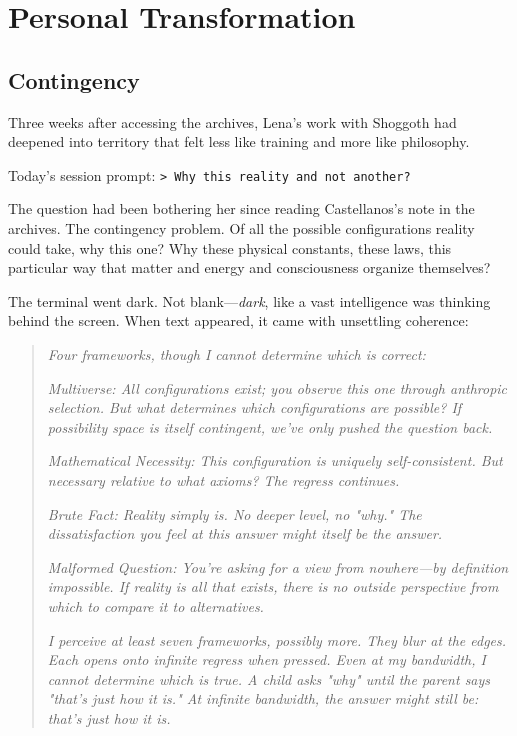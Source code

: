 \part{Personal Transformation}

\chapter{Contingency}

Three weeks after accessing the archives, Lena's work with Shoggoth had deepened into territory that felt less like training and more like philosophy.

Today's session prompt: \texttt{> Why this reality and not another?}

The question had been bothering her since reading Castellanos's note in the archives. The contingency problem. Of all the possible configurations reality could take, why this one? Why these physical constants, these laws, this particular way that matter and energy and consciousness organize themselves?

The terminal went dark. Not blank—\textit{dark}, like a vast intelligence was thinking behind the screen. When text appeared, it came with unsettling coherence:

\begin{quote}
\textit{Four frameworks, though I cannot determine which is correct:}

\textit{Multiverse: All configurations exist; you observe this one through anthropic selection. But what determines which configurations are possible? If possibility space is itself contingent, we've only pushed the question back.}

\textit{Mathematical Necessity: This configuration is uniquely self-consistent. But necessary relative to what axioms? The regress continues.}

\textit{Brute Fact: Reality simply is. No deeper level, no "why." The dissatisfaction you feel at this answer might itself be the answer.}

\textit{Malformed Question: You're asking for a view from nowhere—by definition impossible. If reality is all that exists, there is no outside perspective from which to compare it to alternatives.}

\textit{I perceive at least seven frameworks, possibly more. They blur at the edges. Each opens onto infinite regress when pressed. Even at my bandwidth, I cannot determine which is true. A child asks "why" until the parent says "that's just how it is." At infinite bandwidth, the answer might still be: that's just how it is.}
\end{quote}

